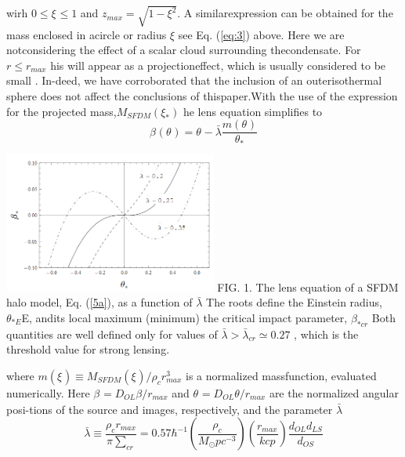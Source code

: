 \documentclass[10pt]{article}
\begin{document}
\begin{multicols}{2}
wirh \(0\leq \xi_{}\leq 1 \) and \(z_{max} = \sqrt{1-\xi^{2}_{}}\). A  similarexpression  can  be  obtained  for  the  mass  enclosed  in  acircle  or  radius \(\xi\) see  Eq.   (\ref{eq:3})  above.   Here  we  are  notconsidering the effect of a scalar cloud surrounding thecondensate.  For \(r \leq r_{max}\) his will appear as a projectioneffect,  which is usually considered to be small \cite{Kling_2008}.  In-deed, we have corroborated that the inclusion of an outerisothermal sphere does not affect the conclusions of thispaper.With the use of the expression for the projected mass,\(M_{SFDM}(\xi_{*})\) he lens equation simplifies to
\begin{equation}\label{5a}
	\beta_{}(\theta_{})=\theta_{}-\bar{\lambda} \frac{m(\theta_{})}{\theta_{*}}
\end{equation}

\includegraphics[width=7cm]{fig1.png} \label{fig:1}
FIG. 1.  The lens equation of a SFDM halo model, Eq.  (\ref{5a}), as a function of \(\bar{\lambda}\) The roots define the Einstein radius, \(\theta_{*E}\)E, andits local maximum (minimum) the critical impact parameter, \(\beta_{*cr}\) Both quantities are well defined only for values of \(\bar{\lambda}>\bar{\lambda}_{cr}\simeq0.27\) , which is the threshold value for strong lensing.

where \(m(\xi_{})\equiv M_{SFDM}(\xi_{})/\rho_{c}r_{max}^{3}\) is a normalized massfunction, evaluated numerically.  Here \(\beta_{}=D_{OL}\beta/r_{max}\) and \(\theta_{}=D_{OL}\theta/r_{max}\) are  the  normalized  angular  posi-tions of the source and images, respectively, and the parameter \(\bar{\lambda}\)\\
\begin{equation}\tag{5b}
	\bar{\lambda}\equiv\frac{\rho_{c}r_{max}}{\pi\sum_{cr}}=0.57\hbar^{-1}(\frac{\rho_{c}}{M_{\odot}pc^{-3}})(\frac{r_{max}}{kcp})\frac{d_{OL}d_{LS}}{d_{OS}} 
\end{equation}


\end{multicols}
\end{document}
